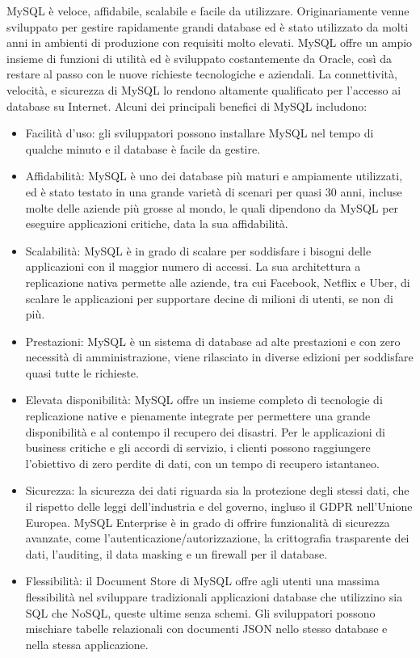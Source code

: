 MySQL è veloce, affidabile, scalabile e facile da utilizzare. Originariamente venne sviluppato per gestire rapidamente grandi database ed è stato utilizzato da molti anni in ambienti di produzione con requisiti molto elevati. MySQL offre un ampio insieme di funzioni di utilità ed è sviluppato costantemente da Oracle, così da restare al passo con le nuove richieste tecnologiche e aziendali. La connettività, velocità, e sicurezza di MySQL lo rendono altamente qualificato per l'accesso ai database su Internet. Alcuni dei principali benefici di MySQL includono:
\begin{itemize}
    \item Facilità d'uso: gli sviluppatori possono installare MySQL nel tempo di qualche minuto e il database è facile da gestire.
    \item Affidabilità: MySQL è uno dei database più maturi e ampiamente utilizzati, ed è stato testato in una grande varietà di scenari per quasi 30 anni, incluse molte delle aziende più grosse al mondo, le quali dipendono da MySQL per eseguire applicazioni critiche, data la sua affidabilità.
    \item Scalabilità: MySQL è in grado di scalare per soddisfare i bisogni delle applicazioni con il maggior numero di accessi. La sua architettura a replicazione nativa permette alle aziende, tra cui Facebook, Netflix e Uber, di scalare le applicazioni per supportare decine di milioni di utenti, se non di più.
    \item Prestazioni: MySQL è un sistema di database ad alte prestazioni e con zero necessità di amministrazione, viene rilasciato in diverse edizioni per soddisfare quasi tutte le richieste.
    \item Elevata disponibilità: MySQL offre un insieme completo di tecnologie di replicazione native e pienamente integrate per permettere una grande disponibilità e al contempo il recupero dei disastri. Per le applicazioni di business critiche e gli accordi di servizio, i clienti possono raggiungere l'obiettivo di zero perdite di dati, con un tempo di recupero istantaneo.
    \item Sicurezza: la sicurezza dei dati riguarda sia la protezione degli stessi dati, che il rispetto delle leggi dell'industria e del governo, ingluso il GDPR nell'Unione Europea. MySQL Enterprise è in grado di offrire funzionalità di sicurezza avanzate, come l'autenticazione/autorizzazione, la crittografia trasparente dei dati, l'auditing, il data masking e un firewall per il database.
    \item Flessibilità: il Document Store di MySQL offre agli utenti una massima flessibilità nel sviluppare tradizionali applicazioni database che utilizzino sia SQL che NoSQL, queste ultime senza schemi. Gli sviluppatori possono mischiare tabelle relazionali con documenti JSON nello stesso database e nella stessa applicazione.
\end{itemize}

